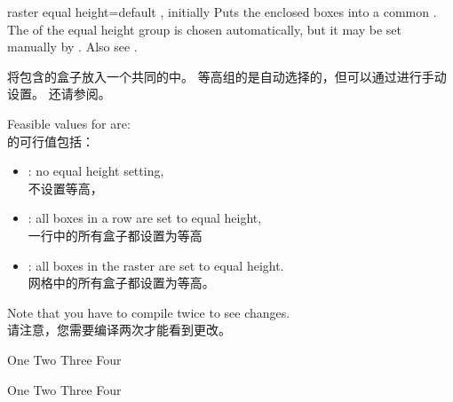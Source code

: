 \begin{docTcbKey}[][doc new and updated={2014-11-10}{2017-02-28}]{raster equal height}{=}{default , initially }
Puts the enclosed boxes into a common .
The  of the equal height group is chosen automatically, but
it may be set manually by .
Also see .

将包含的盒子放入一个共同的中。 等高组的是自动选择的，但可以通过进行手动设置。 还请参阅。

Feasible values for  are:\\的可行值包括：
\begin{itemize}
\item{}: no equal height setting,\\不设置等高，
\item{}: all boxes in a row are set to equal height,\\一行中的所有盒子都设置为等高
\item{}: all boxes in the raster are set to equal height.\\网格中的所有盒子都设置为等高。
\end{itemize}
Note that you have to compile twice to see changes.\\请注意，您需要编译两次才能看到更改。

\begin{dispExample}
\begin{tcbitemize}[raster equal height=rows,
size=small,colframe=red!50!black,colback=red!10!white]
\tcbitem One
\tcbitem \Huge Two
\tcbitem Three
\tcbitem Four
\end{tcbitemize}
\end{dispExample}
\begin{dispExample}
\begin{tcbitemize}[raster equal height,
size=small,colframe=red!50!black,colback=red!10!white]
\tcbitem One
\tcbitem \Huge Two
\tcbitem Three
\tcbitem Four
\end{tcbitemize}
\end{dispExample}
\end{docTcbKey}


